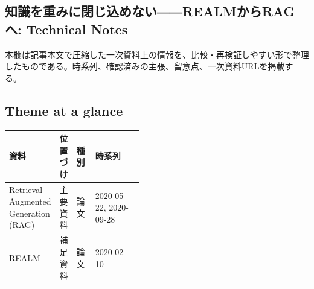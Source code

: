\subsection*{知識を重みに閉じ込めない――REALMからRAGへ: Technical Notes}
本欄は記事本文で圧縮した一次資料上の情報を、比較・再検証しやすい形で整理したものである。時系列、確認済みの主張、留意点、一次資料URLを掲載する。
\smallskip
{}\par
\medskip
\subsection*{Theme at a glance}
\begin{center}
\footnotesize
\begin{tabularx}{\linewidth}{@{}p{0.20\linewidth}p{0.10\linewidth}p{0.14\linewidth}X@{}}
\toprule
資料 & 位置づけ & 種別 & 時系列 \\
\midrule
Retrieval-Augmented Generation (RAG) & 主要資料 & 論文 & 2020-05-22, 2020-09-28 \\
REALM & 補足資料 & 論文 & 2020-02-10 \\
\bottomrule
\end{tabularx}
\end{center}
\normalsize

